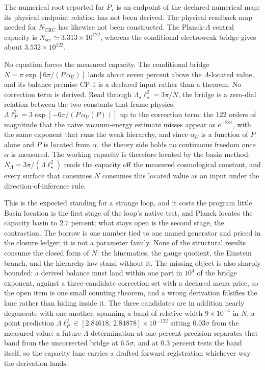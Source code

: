 \documentclass[11pt]{article}
\begin{document}
The numerical root reported for \(P_\star\) is an
endpoint of the declared numerical map; its physical endpoint relation has not been derived. The
physical readback map needed for \(N_{\mathrm{CRC}}\) has likewise not been constructed. The
Planck-\(\Lambda\) central capacity is \(N_{\mathrm{scr}}\simeq3.313\times10^{122}\), whereas the
conditional electroweak bridge gives about \(3.532\times10^{122}\).

No equation forces the measured capacity. The conditional bridge
\(N=\pi\exp[6\pi/(P\,\alpha_U)]\) lands about seven percent above the
\(\Lambda\)-located value, and its balance premise CP-1 is a declared input rather than a
theorem. No correction term is derived. Read through
\(\Lambda_\star\ell_\star^2=3\pi/N\), the bridge is a zero-dial relation between the two
constants that frame physics, \(\Lambda\ell_P^2=3\exp[-6\pi/(P\,\alpha_U(P))]\) up to the
correction term: the \(122\) orders of magnitude that the naive vacuum-energy estimate misses
appear as \(e^{-281}\), with the same exponent that runs the weak hierarchy, and since
\(\alpha_U\) is a function of \(P\) alone and \(P\) is located from \(\alpha\), the theory
side holds no continuous freedom once \(\alpha\) is measured. The working capacity
is therefore located by the basin method: \(N_\Lambda=3\pi/(\Lambda\ell_\star^2)\) reads the
capacity off the measured cosmological constant, and every surface that consumes \(N\)
consumes this located value as an input under the direction-of-inference rule.

This is the expected standing for a strange loop, and it costs the program little. Basin
location is the first stage of the loop's native test, and Planck locates the capacity basin
to \(2.7\) percent; what stays open is the second stage, the contraction. The borrow is one
number tied to one named generator and priced in the closure ledger; it is not a parameter family.
None of the structural results consume the closed form of \(N\): the kinematics, the gauge
quotient, the Einstein branch, and the hierarchy law stand without it. The missing object is
also sharply bounded: a derived balance must land within one part in \(10^4\) of the bridge
exponent, against a three-candidate correction set with a declared menu price, so the open
item is one small counting theorem, and a wrong derivation falsifies the lane rather than
hiding inside it. The three candidates are in addition nearly degenerate with one another,
spanning a band of relative width \(9\times10^{-4}\) in \(N\), a point prediction
\(\Lambda\ell_P^2\in[2.84618,\,2.84878]\times10^{-122}\) sitting \(0.03\sigma\) from the
measured value: a future \(\Lambda\) determination at one percent precision separates that
band from the uncorrected bridge at \(6.5\sigma\), and at \(0.3\) percent tests the band
itself, so the capacity lane carries a drafted forward registration whichever way the
derivation lands.
\end{document}
